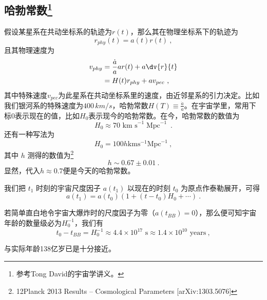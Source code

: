 \subsection{哈勃常数\footnote{参考Tong David的宇宙学讲义。}}

假设某星系在共动坐标系的轨迹为$r(t)$，那么其在物理坐标系下的轨迹为
\begin{equation}
r_{phy}(t)=a(t)r(t)~,
\end{equation}
且其物理速度为
\begin{equation}
\begin{aligned}
v_{phy}& =\frac{\dot a}{a}ar(t)+a\dv{r}{t}\\
&=H(t)r_{phy}+av_{pec}~,
\end{aligned}
\end{equation}
其中特殊速度$v_{pec}$为此星系在共动坐标系里的速度，由近邻星系的引力决定。比如我们银河系的特殊速度为$400\,km/s$，哈勃常数$H(T)\equiv \frac{\dot a}{a}$。在宇宙学里，常用下标0表示现在的值，比如$H_0$表示现今的哈勃常数。在今，哈勃常数的数值为
\begin{equation}H_0\approx70\text{ km s}^{-1}\operatorname{Mpc}^{-1}~.
\end{equation}
还有一种写法为
\begin{equation}H_0=100h \mathrm{km} \mathrm{s}^{-1} \mathrm{Mpc}^{-1}~,\end{equation}
其中 $h$ 测得的数值为\footnote{12Planck 2013 Results – Cosmological Parameters [arXiv:1303.5076]}
\begin{equation}
h\sim 0.67 \pm 0.01~.
\end{equation}显然，代入$h\approx 0.7$便是今天的哈勃常数。

我们把 $t_1$ 时刻的宇宙尺度因子 $a(t_1)$ 以现在的时刻 $t_0$ 为原点作泰勒展开，可得
\begin{equation}
a(t_1)=a(t_0)(1+(t-t_0)H_0+\cdots)~.
\end{equation}

若简单直白地令宇宙大爆炸时的尺度因子为零（$a(t_{BB})=0$），那么便可知宇宙年龄的数量级必为$H_0^{-1}$，我们有
\begin{equation}t_0-t_{BB}=H_0^{-1}\approx4.4\times10^{17}\text{ s}\approx1.4\times10^{10}\text{ years}~,\end{equation}

与实际年龄138亿岁已是十分接近。
